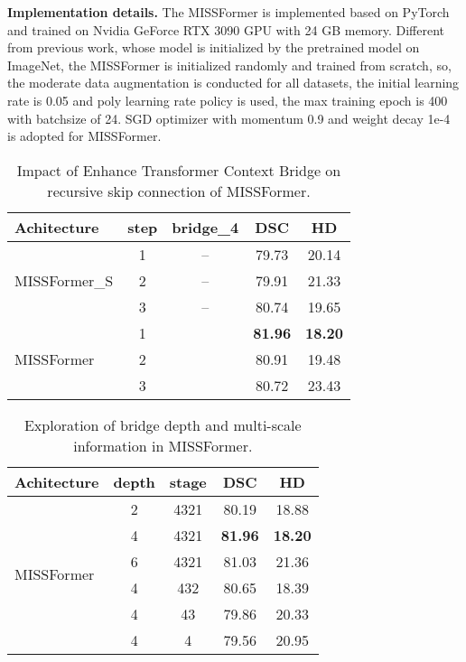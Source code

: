 \documentclass[letterpaper]{article} \usepackage{aaai22}  \usepackage{times}  \usepackage{helvet}  \usepackage{courier}  \usepackage[hyphens]{url}  \usepackage{graphicx} \urlstyle{rm} \def\UrlFont{\rm}  \usepackage{natbib}  \usepackage{caption} \DeclareCaptionStyle{ruled}{labelfont=normalfont,labelsep=colon,strut=off} \frenchspacing  \setlength{\pdfpagewidth}{8.5in}  \setlength{\pdfpageheight}{11in}  \usepackage{algorithm}
\begin{document}
\textbf{Implementation details.} The MISSFormer is implemented based on PyTorch and trained on Nvidia GeForce RTX 3090 GPU with 24 GB memory. Different from previous work\cite{Cao2021,Chen2021}, whose model is initialized by the pretrained model on ImageNet, the MISSFormer is initialized randomly and trained from scratch, so, the moderate data augmentation is conducted for all datasets, the initial learning rate is 0.05 and poly learning rate policy is used, the max training epoch is 400 with batchsize of 24. SGD optimizer with momentum 0.9 and weight decay 1e-4 is adopted for MISSFormer. 
\begin{table}[t]
	\centering
	\begin{tabular}{l|c|c|c|c}
		\hline
		Achitecture & step& bridge\_4 & DSC & HD \\
		\hline
		\hline
\multirow{3}{*}{MISSFormer\_S}
		& 1&--& 79.73& 20.14	\\
		& 2&--& 79.91& 21.33	\\
		& 3&--& 80.74&19.65	\\	
		\hline
		\multirow{3}{*}{MISSFormer}
		& 1&\checkmark& \textbf{81.96}& \textbf{18.20}	\\
		& 2&\checkmark& 80.91& 19.48	\\
		& 3&\checkmark& 80.72& 23.43	\\	
		\hline
	\end{tabular}
	\caption{Impact of Enhance Transformer Context Bridge on recursive skip connection of MISSFormer. }
	\label{table4}
\end{table}
\begin{table}[t]
	\centering
	\begin{tabular}{l|c|c|c|c}
		\hline
		Achitecture & depth & stage & DSC & HD \\
		\hline
		\hline
\multirow{6}{*}{MISSFormer    }
		& 2&4321& 80.19& 18.88	\\
		& 4&4321& \textbf{81.96}& \textbf{18.20}	\\
		& 6&4321&81.03&21.36	\\	\cline{2-5} 
& 4&432& 80.65&18.39\\
		& 4&43& 79.86& 20.33	\\
		& 4&4& 79.56 &20.95	\\	
		\hline
	\end{tabular}
\caption{Exploration of bridge depth and multi-scale information in MISSFormer. }
	\label{table5}
\end{table}
\end{document}
